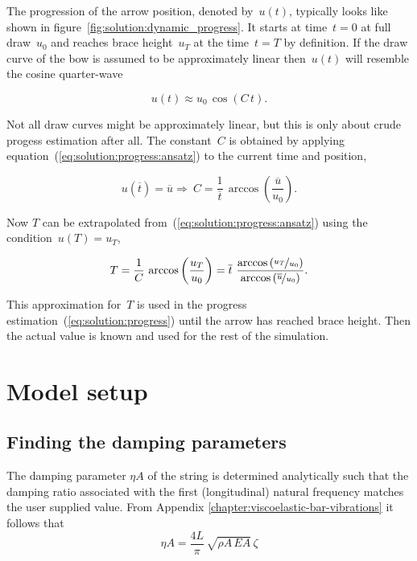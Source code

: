 The progression of the arrow position, denoted by~$u(t)$, typically looks like shown in figure~\ref{fig:solution:dynamic_progress}.
It starts at time~$t = 0$ at full draw~$u_0$ and reaches brace height~$u_T$ at the time~$t = T$ by definition.
If the draw curve of the bow is assumed to be approximately linear then~$u(t)$ will resemble the cosine quarter-wave

\begin{equation}
u(t) \approx u_{0}\,\cos{\left(C\,t\right)}.\label{eq:solution:progress:ansatz}
\end{equation}

Not all draw curves might be approximately linear, but this is only about crude progess estimation after all.
The constant~$C$ is obtained by applying equation~(\ref{eq:solution:progress:ansatz}) to the current time and position,

\begin{equation}
u(\overline{t}) = \overline{u} \Rightarrow \ C = \frac{1}{\overline{t}}\,\arccos{\left(\frac{\overline{u}}{u_0}\right)}.\label{eq:solution:progress:constant}
\end{equation}

Now $T$ can be extrapolated from~(\ref{eq:solution:progress:ansatz}) using the condition~$u(T) = u_T$,

\begin{align}
T = \frac{1}{C}\,\arccos{\left(\frac{u_T}{u_0}\right)} = \overline{t}\ \frac{\arccos{\left(\nicefrac{u_T}{u_0}\right)}}{\arccos{\left(\nicefrac{\overline{u}}{u_0}\right)}}.
\end{align}

This approximation for~$T$ is used in the progress estimation~(\ref{eq:solution:progress}) until the arrow has reached brace height. Then the actual value is known and used for the rest of the simulation.




\newpage
\section{Model setup}

\subsection{Finding the damping parameters}

The damping parameter $\eta A$ of the string is determined analytically such that the damping ratio associated with the first (longitudinal) natural frequency matches the user supplied value. From Appendix \ref{chapter:viscoelastic-bar-vibrations} it follows that
%
\begin{equation}
\eta A = \frac{4L}{\pi}\,\sqrt{\rho A\,EA}\,\zeta
\end{equation}

